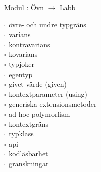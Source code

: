 
    Modul : Övn  $\rightarrow$ Labb 
    \begin{multicols}{3}\SlideFontTiny
    $\square$ övre- och undre typgräns \\
$\square$ varians \\
$\square$ kontravarians \\
$\square$ kovarians \\
$\square$ typjoker \\
$\square$ egentyp \\
$\square$ givet värde (given) \\
$\square$ kontextparameter (using) \\
$\square$ generiska extensionsmetoder \\
$\square$ ad hoc polymorfism \\
$\square$ kontextgräns \\
$\square$ typklass \\
$\square$ api \\
$\square$ kodläsbarhet \\
$\square$ granskningar \\
    \end{multicols}
    